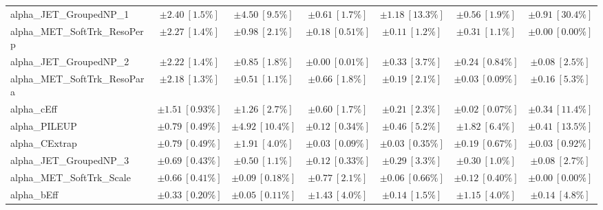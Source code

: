 \begin{sidewaystable}
\begin{center}
\begin{tabular*}{\textwidth}{@{\extracolsep{\fill}}lcccccc}
alpha\_JET\_GroupedNP\_1         & $\pm 2.40\ [1.5\%] $          & $\pm 4.50\ [9.5\%] $          & $\pm 0.61\ [1.7\%] $          & $\pm 1.18\ [13.3\%] $          & $\pm 0.56\ [1.9\%] $          & $\pm 0.91\ [30.4\%] $       \\
alpha\_MET\_SoftTrk\_ResoPerp         & $\pm 2.27\ [1.4\%] $          & $\pm 0.98\ [2.1\%] $          & $\pm 0.18\ [0.51\%] $          & $\pm 0.11\ [1.2\%] $          & $\pm 0.31\ [1.1\%] $          & $\pm 0.00\ [0.00\%] $       \\
alpha\_JET\_GroupedNP\_2         & $\pm 2.22\ [1.4\%] $          & $\pm 0.85\ [1.8\%] $          & $\pm 0.00\ [0.01\%] $          & $\pm 0.33\ [3.7\%] $          & $\pm 0.24\ [0.84\%] $          & $\pm 0.08\ [2.5\%] $       \\
alpha\_MET\_SoftTrk\_ResoPara         & $\pm 2.18\ [1.3\%] $          & $\pm 0.51\ [1.1\%] $          & $\pm 0.66\ [1.8\%] $          & $\pm 0.19\ [2.1\%] $          & $\pm 0.03\ [0.09\%] $          & $\pm 0.16\ [5.3\%] $       \\
alpha\_cEff         & $\pm 1.51\ [0.93\%] $          & $\pm 1.26\ [2.7\%] $          & $\pm 0.60\ [1.7\%] $          & $\pm 0.21\ [2.3\%] $          & $\pm 0.02\ [0.07\%] $          & $\pm 0.34\ [11.4\%] $       \\
alpha\_PILEUP         & $\pm 0.79\ [0.49\%] $          & $\pm 4.92\ [10.4\%] $          & $\pm 0.12\ [0.34\%] $          & $\pm 0.46\ [5.2\%] $          & $\pm 1.82\ [6.4\%] $          & $\pm 0.41\ [13.5\%] $       \\
alpha\_CExtrap         & $\pm 0.79\ [0.49\%] $          & $\pm 1.91\ [4.0\%] $          & $\pm 0.03\ [0.09\%] $          & $\pm 0.03\ [0.35\%] $          & $\pm 0.19\ [0.67\%] $          & $\pm 0.03\ [0.92\%] $       \\
alpha\_JET\_GroupedNP\_3         & $\pm 0.69\ [0.43\%] $          & $\pm 0.50\ [1.1\%] $          & $\pm 0.12\ [0.33\%] $          & $\pm 0.29\ [3.3\%] $          & $\pm 0.30\ [1.0\%] $          & $\pm 0.08\ [2.7\%] $       \\
alpha\_MET\_SoftTrk\_Scale         & $\pm 0.66\ [0.41\%] $          & $\pm 0.09\ [0.18\%] $          & $\pm 0.77\ [2.1\%] $          & $\pm 0.06\ [0.66\%] $          & $\pm 0.12\ [0.40\%] $          & $\pm 0.00\ [0.00\%] $       \\
alpha\_bEff         & $\pm 0.33\ [0.20\%] $          & $\pm 0.05\ [0.11\%] $          & $\pm 1.43\ [4.0\%] $          & $\pm 0.14\ [1.5\%] $          & $\pm 1.15\ [4.0\%] $          & $\pm 0.14\ [4.8\%] $       \\

\end{tabular*}
\end{center}
\end{sidewaystable}
